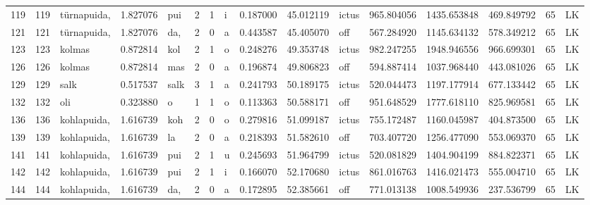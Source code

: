 \begin{tabular}{lrlrllllrrlrrrll}
119  &         119 &      türnapuida, &  1.827076 &     pui &        2 &      1 &       i &      0.187000 &     45.012119 &  ictus &   965.804056 &  1435.653848 &   469.849792 &     65 &        LK \\
121  &         121 &      türnapuida, &  1.827076 &     da, &        2 &      0 &       a &      0.443587 &     45.405070 &    off &   567.284920 &  1145.634132 &   578.349212 &     65 &        LK \\
123  &         123 &           kolmas &  0.872814 &     kol &        2 &      1 &       o &      0.248276 &     49.353748 &  ictus &   982.247255 &  1948.946556 &   966.699301 &     65 &        LK \\
126  &         126 &           kolmas &  0.872814 &     mas &        2 &      0 &       a &      0.196874 &     49.806823 &    off &   594.887414 &  1037.968440 &   443.081026 &     65 &        LK \\
129  &         129 &             salk &  0.517537 &    salk &        3 &      1 &       a &      0.241793 &     50.189175 &  ictus &   520.044473 &  1197.177914 &   677.133442 &     65 &        LK \\
132  &         132 &              oli &  0.323880 &       o &        1 &      1 &       o &      0.113363 &     50.588171 &    off &   951.648529 &  1777.618110 &   825.969581 &     65 &        LK \\
136  &         136 &      kohlapuida, &  1.616739 &     koh &        2 &      0 &       o &      0.279816 &     51.099187 &  ictus &   755.172487 &  1160.045987 &   404.873500 &     65 &        LK \\
139  &         139 &      kohlapuida, &  1.616739 &      la &        2 &      0 &       a &      0.218393 &     51.582610 &    off &   703.407720 &  1256.477090 &   553.069370 &     65 &        LK \\
141  &         141 &      kohlapuida, &  1.616739 &     pui &        2 &      1 &       u &      0.245693 &     51.964799 &  ictus &   520.081829 &  1404.904199 &   884.822371 &     65 &        LK \\
142  &         142 &      kohlapuida, &  1.616739 &     pui &        2 &      1 &       i &      0.166070 &     52.170680 &  ictus &   861.016763 &  1416.021473 &   555.004710 &     65 &        LK \\
144  &         144 &      kohlapuida, &  1.616739 &     da, &        2 &      0 &       a &      0.172895 &     52.385661 &    off &   771.013138 &  1008.549936 &   237.536799 &     65 &        LK \\

\end{tabular}
